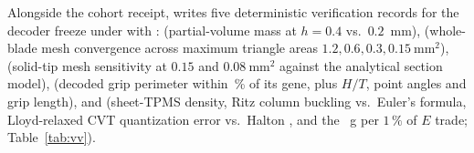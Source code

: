 Alongside the cohort receipt,  writes five deterministic verification records for the  decoder freeze under 
with :  (partial-volume mass at $h = 0.4$ vs.\ $0.2$~mm),  (whole-blade
 mesh convergence across maximum triangle areas $1.2, 0.6, 0.3, 0.15~\mathrm{mm^2}$), 
(solid-tip  mesh sensitivity at $0.15$ and $0.08~\mathrm{mm^2}$ against the analytical section model),
 (decoded grip perimeter within \gVvPerimErrPct\,\% of its gene, plus $H/T$, point angles and grip
length), and  (sheet-TPMS density, Ritz column buckling vs.\ Euler's formula, Lloyd-relaxed CVT quantization
error \gVvLloydErr{} vs.\ Halton \gVvHaltonErr, and the \gVvGramsPerPctE~g per $1\,\%$ of $E$ trade; Table~\ref{tab:vv}).

